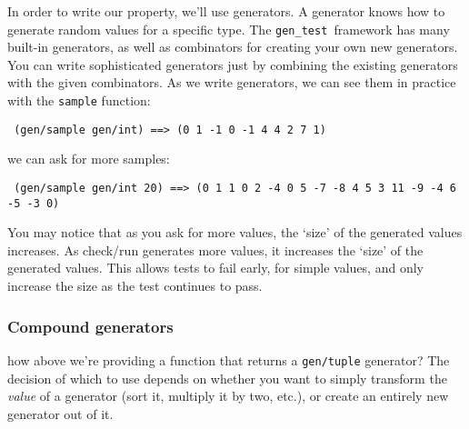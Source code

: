\documentclass{scrartcl}
\begin{document}
In order to write our property, we'll use generators. A generator knows how to
generate random values for a specific type. The \texttt{gen\_test }framework
 has many built-in generators, as well as combinators for creating
your own new generators. You can write sophisticated generators just by
combining the existing generators with the given combinators. As we write
generators, we can see them in practice with the \texttt{sample} function:

\texttt{
(gen/sample gen/int)
==\textgreater{} (0 1 -1 0 -1 4 4 2 7 1)
}

we can ask for more samples:

\texttt{
(gen/sample gen/int 20)
==\textgreater{} (0 1 1 0 2 -4 0 5 -7 -8 4 5 3 11 -9 -4 6 -5 -3 0)
}

You may notice that as you ask for more values, the `size' of the generated
values increases. As check/run generates more values, it increases the
`size' of the generated values. This allows tests to fail early, for simple
values, and only increase the size as the test continues to pass.

\subsubsection{Compound generators}\hypertarget{compound-generators}{}\label{compound-generators}

how above we're providing a function that returns a \texttt{gen/tuple} generator? The
decision of which to use depends on whether you want to simply transform the
\emph{value} of a generator (sort it, multiply it by two, etc.), or create an
entirely new generator out of it.
\end{document}
